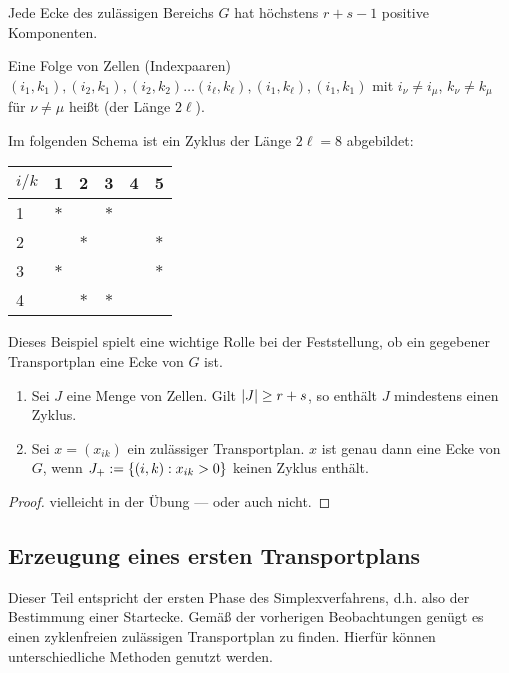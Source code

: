 \begin{folgerung} %
	Jede Ecke des zulässigen Bereichs $G$ hat höchstens $r+s-1$ positive Komponenten.
\end{folgerung}

\begin{definition} %
	Eine Folge von Zellen (Indexpaaren) $(i_1, k_1), (i_2, k_1), (i_2, k_2) \dots (i_\ell, k_\ell), (i_1, k_\ell), (i_1, k_1)$ mit $i_\nu \neq i_\mu$, $k_\nu \neq k_\mu$ für $\nu \neq \mu$ heißt  (der Länge $2 \ell$).
\end{definition}

\begin{beispiel} %
	Im folgenden Schema ist ein Zyklus der Länge $2 \ell = 8$ abgebildet:
	\begin{center}
		\begin{tabular}{l|ccccc}
			$i / k$ & 1 & 2 & 3 & 4 & 5 \\ \hline
			1       & $\ast$ & & $\ast$ & & \\
			2 & & $\ast$ & & & $\ast$ \\
			3 & $\ast$ & & & & $\ast$ \\
			4 & & $\ast$ & $\ast$ & & 
		\end{tabular}
	\end{center}
	Dieses Beispiel spielt eine wichtige Rolle bei der Feststellung, ob ein gegebener Transportplan eine Ecke von $G$ ist.
\end{beispiel}

\begin{aussage} %
	\begin{enumerate}[label=(\roman*), nolistsep, topsep=-\parskip]
		\item Sei $J$ eine Menge von Zellen. Gilt $\left| J \right| \ge r+s$, so enthält $J$ mindestens einen Zyklus.
		\item Sei $x = (x_{ik})$ ein zulässiger Transportplan. $x$ ist genau dann eine Ecke von $G$, wenn $J_+ \mathrel{:=} \left\{ (i,k) : x_{ik} > 0 \right\}$ keinen Zyklus enthält.
	\end{enumerate}
\end{aussage}
\begin{proof}
	vielleicht in der Übung --- oder auch nicht.
\end{proof}

\subsection{Erzeugung eines ersten Transportplans}
Dieser Teil entspricht der ersten Phase des Simplexverfahrens, d.h. also der Bestimmung einer Startecke.
Gemäß der vorherigen Beobachtungen genügt es einen zyklenfreien zulässigen Transportplan zu finden. Hierfür können unterschiedliche Methoden genutzt werden.

